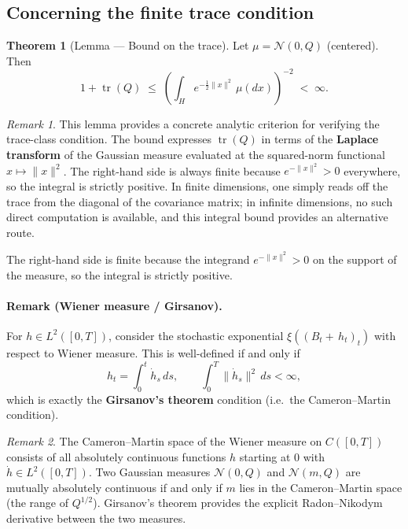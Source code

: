 \documentclass[11pt]{article}
\theoremstyle{definition}
\newtheorem{theorem}{Theorem}
\theoremstyle{remark}
\newtheorem{remark}{Remark}
\DeclareMathOperator{\tr}{tr}
\begin{document}
\subsection*{Concerning the finite trace condition}

\begin{theorem}[Lemma --- Bound on the trace]
Let $\mu = \mathcal{N}(0, Q)$ (centered).  Then
\[
    1 + \tr(Q)
    \;\le\;
    \left(\int_H e^{-\frac{1}{2}\|x\|^2}\,\mu(dx)\right)^{-2}
    \;<\; \infty.
\]
\end{theorem}

\begin{remark}
This lemma provides a concrete analytic criterion for verifying the trace-class condition.  The bound expresses $\tr(Q)$ in terms of the \textbf{Laplace transform} of the Gaussian measure evaluated at the squared-norm functional $x \mapsto \|x\|^2$.  The right-hand side is always finite because $e^{-\|x\|^2} > 0$ everywhere, so the integral is strictly positive.  In finite dimensions, one simply reads off the trace from the diagonal of the covariance matrix; in infinite dimensions, no such direct computation is available, and this integral bound provides an alternative route.
\end{remark}

\noindent
The right-hand side is finite because the integrand $e^{-\|x\|^2} > 0$
on the support of the measure, so the integral is strictly positive.

\paragraph{Remark (Wiener measure / Girsanov).}
For $h \in L^2([0,T])$, consider the stochastic exponential
$\mathcal{\xi}((B_t + \,h_t)_t)$ with respect to Wiener measure.
This is well-defined if and only if
\[
    h_t = \int_0^t \dot{h}_s\,ds,
    \qquad
    \int_0^T \|\dot{h}_s\|^2\,ds < \infty,
\]
which is exactly the \textbf{Girsanov's theorem} condition
(i.e.\ the Cameron--Martin condition).

\begin{remark}
The Cameron--Martin space of the Wiener measure on $C([0,T])$ consists of all absolutely continuous functions $h$ starting at $0$ with $\dot{h} \in L^2([0,T])$.  Two Gaussian measures $\mathcal{N}(0,Q)$ and $\mathcal{N}(m,Q)$ are mutually absolutely continuous if and only if $m$ lies in the Cameron--Martin space (the range of $Q^{1/2}$).  Girsanov's theorem provides the explicit Radon--Nikodym derivative between the two measures.
\end{remark}
\end{document}
